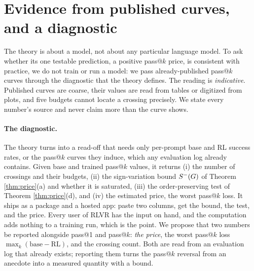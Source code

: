 \section{Evidence from published curves, and a diagnostic}
\label{sec:published}

The theory is about a model, not about any particular language model. To ask
whether its one testable prediction, a positive pass@$k$ price, is consistent
with practice, we do not train or run a model: we pass already-published pass@$k$
curves through the diagnostic that the theory defines. The reading is
\emph{indicative}. Published curves are coarse, their values are read from
tables or digitized from plots, and five budgets cannot locate a crossing
precisely. We state every number's source and never claim more than the curve
shows.

\paragraph{The diagnostic.}
The theory turns into a read-off that needs only per-prompt base and RL success
rates, or the pass@$k$ curves they induce, which any evaluation log already
contains. Given base and trained pass@$k$ values, it returns (i) the number of
crossings and their budgets, (ii) the sign-variation bound $S^{-}(G)$ of Theorem
\ref{thm:price}(a) and whether it is saturated, (iii) the order-preserving test
of Theorem \ref{thm:price}(d), and (iv) the estimated price, the worst pass@$k$
loss. It ships as a package and a hosted app: paste two columns, get the bound,
the test, and the price. Every user of RLVR has the input on hand, and the
computation adds nothing to a training run, which is the point. We propose that
two numbers be reported alongside pass@1 and pass@$k$: \emph{the price}, the
worst pass@$k$ loss $\max_k(\text{base}-\text{RL})$, and the crossing count.
Both are read from an evaluation log that already exists; reporting them turns
the pass@$k$ reversal from an anecdote into a measured quantity with a bound.

